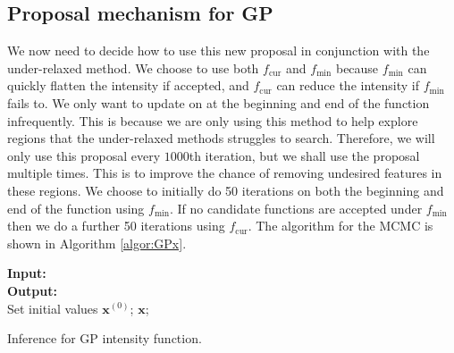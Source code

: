 \documentclass[oneside, 12 pt]{book}
\begin{document}
  \subsection{Proposal mechanism for GP}
We now need to decide how to use this new proposal in conjunction with the under-relaxed method. We choose to use both $f_{\mathrm{cur}}$ and $f_{\mathrm{min}}$  because $f_{\mathrm{min}}$ can quickly flatten the intensity if accepted, and $f_{\mathrm{cur}}$ can reduce the intensity if $f_{\mathrm{min}}$ fails to. We only want to update on at the beginning and end of the function infrequently. This is because we are only using this method to help explore regions that the under-relaxed methods struggles to search. Therefore, we will only use this proposal every $1000$th iteration, but we shall use the proposal multiple times. This is to improve the chance of removing undesired features in these regions. We choose to initially do 50 iterations on both the beginning and end of the function using $f_{\mathrm{min}}$. %
If no candidate functions are accepted under $f_{\mathrm{min}}$ then we do a further 50 iterations using $f_\mathrm{cur}$. The algorithm for the MCMC is shown in Algorithm \ref{algor:GPx}.

\begin{algorithm}[t]
\DontPrintSemicolon
\textbf{Input:}  \\
\textbf{Output:}  \\
Set initial values $\mathbf{x}^{(0)}$; \; 
 $\mathbf{x}$; 
\caption{Inference for GP intensity function.}
\label{algor:GPx}
\end{algorithm} 



      
\end{document}
